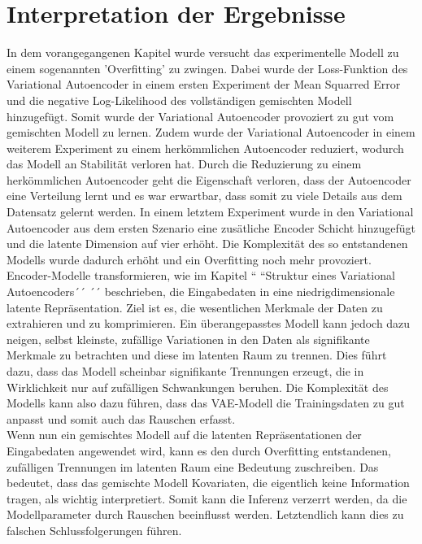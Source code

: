\documentclass[%
thesis=student,%
coverpage=false,%
titlepage=false,%
headmarks=true, %
german,%
font=libertine, %
math=newpxtx, %
BCOR=5mm,%
coverBCOR=11mm%
]{tumbook}
\theoremstyle{break}
\begin{document}
\section{Interpretation der Ergebnisse}
In dem vorangegangenen Kapitel wurde versucht das experimentelle Modell zu einem sogenannten 'Overfitting' zu zwingen. Dabei wurde der Loss-Funktion des Variational Autoencoder in einem ersten Experiment der Mean Squarred Error und die negative Log-Likelihood des vollständigen gemischten Modell hinzugefügt. Somit wurde der Variational Autoencoder provoziert zu gut vom gemischten Modell zu lernen. Zudem wurde der Variational Autoencoder in einem weiterem Experiment zu einem herkömmlichen Autoencoder reduziert, wodurch das Modell an Stabilität verloren hat. Durch die Reduzierung zu einem herkömmlichen Autoencoder geht die Eigenschaft verloren, dass der Autoencoder eine Verteilung lernt und es war erwartbar, dass somit zu viele Details aus dem Datensatz gelernt werden. In einem letztem Experiment wurde in den Variational Autoencoder aus dem ersten Szenario eine zusätliche Encoder Schicht hinzugefügt und die latente Dimension auf vier erhöht. Die Komplexität des so entstandenen Modells wurde dadurch erhöht und ein Overfitting noch mehr provoziert. Encoder-Modelle transformieren, wie im Kapitel `` ``Struktur eines Variational Autoencoders´´ ´´ beschrieben, die Eingabedaten in eine niedrigdimensionale latente Repräsentation. Ziel ist es, die wesentlichen Merkmale der Daten zu extrahieren und zu komprimieren. Ein überangepasstes Modell kann jedoch dazu neigen, selbst kleinste, zufällige Variationen in den Daten als signifikante Merkmale zu betrachten und diese im latenten Raum zu trennen. Dies führt dazu, dass das Modell scheinbar signifikante Trennungen erzeugt, die in Wirklichkeit nur auf zufälligen Schwankungen beruhen. Die Komplexität des Modells kann also dazu führen, dass das VAE-Modell die Trainingsdaten zu gut anpasst und somit auch das Rauschen erfasst.\\
Wenn nun ein gemischtes Modell auf die latenten Repräsentationen der Eingabedaten angewendet wird, kann es den durch Overfitting entstandenen, zufälligen Trennungen im latenten Raum eine Bedeutung zuschreiben. Das bedeutet, dass das gemischte Modell Kovariaten, die eigentlich keine Information tragen, als wichtig interpretiert. Somit kann die Inferenz verzerrt werden, da die Modellparameter durch Rauschen beeinflusst werden. Letztendlich kann dies zu falschen Schlussfolgerungen führen.\\
\\
\end{document}
